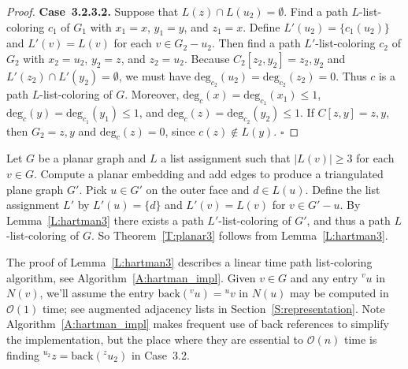 \documentclass[12pt,letterpaper]{article}
\newcommand{\adj}[2]{{}^{#1}{#2}}
\newcommand{\bck}{\text{back}}
\theoremstyle{plain}
\theoremstyle{definition}
\theoremstyle{break}
\newcommand{\ggcqedsymbol}{$\square$}
\newcommand{\ggcqed}{\hbox{}\nobreak\hbox{\quad\ggcqedsymbol}}
\newcommand{\ggcnopf}{\ggcqed}
\begin{document}
\begin{proof}
\textbf{Case~3.2.3.2.} Suppose that $L(z)\cap L(u_2)=\emptyset$. Find
a path $L$-list-coloring $c_1$ of $G_1$ with
$x_1=x$, $y_1=y$, and $z_1=x$. Define $L'(u_2)=\{c_1(u_2)\}$ and $L'(v)=L(v)$
for each $v\in G_2-u_2$. Then find a path $L'$-list-coloring $c_2$ of $G_2$
with $x_2=u_2$, $y_2=z$, and $z_2=u_2$. Because
$C_2[z_2,y_2]=z_2,y_2$ and $L'(z_2)\cap L'(y_2)=\emptyset$, we must have
$\text{deg}_{c_2}(u_2)=\text{deg}_{c_2}(z_2)=0$. Thus
$c$ is a path $L$-list-coloring of $G$. Moreover,
$\text{deg}_c(x)=\text{deg}_{c_1}(x_1)\le 1$,
$\text{deg}_c(y)=\text{deg}_{c_1}(y_1)\le 1$, and
$\text{deg}_c(z)=\text{deg}_{c_2}(y_2)\le 1$.
If $C[z,y]=z,y$, then $G_2=z,y$ and $\text{deg}_c(z)=0$, since
$c(z)\not\in L(y)$.
\ggcnopf
\end{proof}

Let $G$ be a planar graph and $L$ a list assignment such
that $|L(v)|\ge 3$ for each $v\in G$. Compute a planar embedding and add
edges
to produce a triangulated plane graph $G'$. Pick $u\in G'$ on the outer face
and $d\in L(u)$. Define the list assignment $L'$ by
$L'(u)=\{d\}$ and $L'(v)=L(v)$ for $v\in G'-u$.
By Lemma~\ref{L:hartman3} there exists a path $L'$-list-coloring of $G'$,
and thus a path $L$-list-coloring of $G$.
So Theorem~\ref{T:planar3} follows from 
Lemma~\ref{L:hartman3}.

The proof of Lemma~\ref{L:hartman3} describes a linear time
path list-coloring algorithm,
see Algorithm~\ref{A:hartman_impl}.
Given $v\in G$ and any entry $\adj{v}{u}$ in $N(v)$, we'll assume
the entry $\bck(\adj{v}{u})=\adj{u}{v}$ in $N(u)$ may be
computed in $\mathcal{O}(1)$ time;
see augmented adjacency lists in
Section~\ref{S:representation}. Note Algorithm~\ref{A:hartman_impl}
makes frequent use of back references to simplify
the implementation, but the place where they are essential to $\mathcal{O}(n)$
time is finding $\adj{u_2}{z}=\bck(\adj{z}{u_2})$ in Case~3.2.
\end{document}

